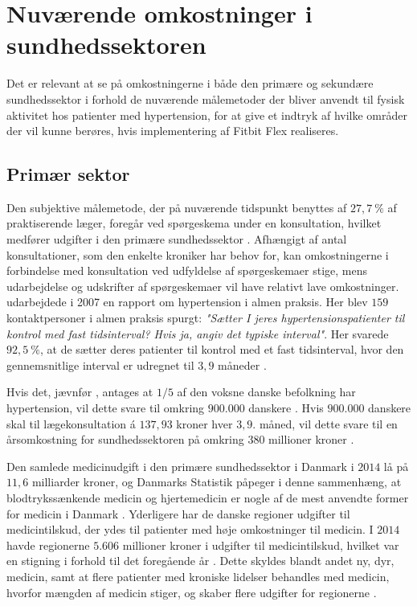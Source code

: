 \section{Nuværende omkostninger i sundhedssektoren}
Det er relevant at se på omkostningerne i både den primære og sekundære sundhedssektor i forhold de nuværende målemetoder der bliver anvendt til fysisk aktivitet hos patienter med hypertension, for at give et indtryk af hvilke områder der vil kunne berøres, hvis implementering af Fitbit Flex realiseres.

\subsection{Primær sektor} \label{sec:nuv_primaer}
\label{sec:primaer_sektor_omkostninger}
Den subjektive målemetode, der på nuværende tidspunkt benyttes af $27,7~\%$ af praktiserende læger, foregår ved spørgeskema under en konsultation, hvilket medfører udgifter i den primære sundhedssektor \citep{munck2007}. Afhængigt af antal konsultationer, som den enkelte kroniker har behov for, kan omkostningerne i forbindelse med konsultation ved udfyldelse af spørgeskemaer stige, mens udarbejdelse og udskrifter af spørgeskemaer vil have relativt lave omkostninger.
\citeauthor{munck2007} udarbejdede i 2007 en rapport om hypertension i almen praksis. Her blev $159$ kontaktpersoner i almen praksis spurgt: \textit{"Sætter I jeres hypertensionspatienter til kontrol med fast tidsinterval? Hvis ja, angiv det typiske interval"}. Her svarede $92,5~\%$, at de sætter deres patienter til kontrol med et fast tidsinterval, hvor den gennemsnitlige interval er udregnet til $3,9$ måneder \citep{munck2007}. 

Hvis det, jævnfør \citeauthor{kronborg2008}, antages at $1/5$ af den voksne danske befolkning har hypertension, vil dette svare til omkring $900.000$ danskere \citep{folketal2016}. Hvis $900.000$ danskere skal til lægekonsultation á $137,93$ kroner hver $3,9$. måned, vil dette svare til en årsomkostning for sundhedssektoren på omkring $380$ millioner kroner \citep{honorartabel2016}. 

Den samlede medicinudgift i den primære sundhedssektor i Danmark i $2014$ lå på $11,6$ milliarder kroner, og Danmarks Statistik påpeger i denne sammenhæng, at blodtrykssænkende medicin og hjertemedicin er nogle af de mest anvendte former for medicin i Danmark \citep{dst2016}. Yderligere har de danske regioner udgifter til medicintilskud, der ydes til patienter med høje omkostninger til medicin. I $2014$ havde regionerne $5.606$ millioner kroner i udgifter til medicintilskud, hvilket var en stigning i forhold til det foregående år \citep{medicinoekonomi2015}. Dette skyldes blandt andet ny, dyr, medicin, samt at flere patienter med kroniske lidelser behandles med medicin, hvorfor mængden af medicin stiger, og skaber flere udgifter for regionerne \citep{regioner2015}. 

